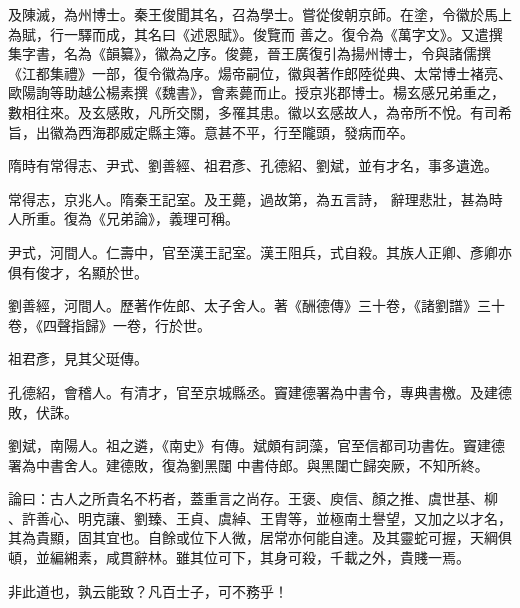 \begin{pinyinscope}
 及陳滅，為州博士。秦王俊聞其名，召為學士。嘗從俊朝京師。在塗，令徽於馬上為賦，行一驛而成，其名曰《述恩賦》。俊覽而
 善之。復令為《萬字文》。又遣撰集字書，名為《韻纂》，徽為之序。俊薨，晉王廣復引為揚州博士，令與諸儒撰《江都集禮》一部，復令徽為序。煬帝嗣位，徽與著作郎陸從典、太常博士褚亮、歐陽詢等助越公楊素撰《魏書》，會素薨而止。授京兆郡博士。楊玄感兄弟重之，數相往來。及玄感敗，凡所交關，多罹其患。徽以玄感故人，為帝所不悅。有司希旨，出徽為西海郡威定縣主簿。意甚不平，行至隴頭，發病而卒。



 隋時有常得志、尹式、劉善經、祖君彥、孔德紹、劉斌，並有才名，事多遺逸。



 常得志，京兆人。隋秦王記室。及王薨，過故第，為五言詩，
 辭理悲壯，甚為時人所重。復為《兄弟論》，義理可稱。



 尹式，河間人。仁壽中，官至漢王記室。漢王阻兵，式自殺。其族人正卿、彥卿亦俱有俊才，名顯於世。



 劉善經，河間人。歷著作佐郎、太子舍人。著《酬德傳》三十卷，《諸劉譜》三十卷，《四聲指歸》一卷，行於世。



 祖君彥，見其父珽傳。



 孔德紹，會稽人。有清才，官至京城縣丞。竇建德署為中書令，專典書檄。及建德敗，伏誅。



 劉斌，南陽人。祖之遴，《南史》有傳。斌頗有詞藻，官至信都司功書佐。竇建德署為中書舍人。建德敗，復為劉黑闥
 中書侍郎。與黑闥亡歸突厥，不知所終。


論曰：古人之所貴名不朽者，蓋重言之尚存。王褒、庾信、顏之推、虞世基、柳
 、許善心、明克讓、劉臻、王貞、虞綽、王胄等，並極南土譽望，又加之以才名，其為貴顯，固其宜也。自餘或位下人微，居常亦何能自達。及其靈蛇可握，天綱俱頓，並編緗素，咸貫辭林。雖其位可下，其身可殺，千載之外，貴賤一焉。



 非此道也，孰云能致？凡百士子，可不務乎！



\end{pinyinscope}